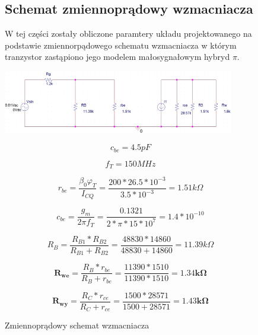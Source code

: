 \documentclass[a4paper,12pt]{article}
\begin{document}
  \begin{figure}
  

\subsection{Schemat zmiennoprądowy wzmacniacza}
W tej części zostały obliczone paramtery układu projektowanego na podstawie zmiennorpądowego schematu
wzmacniacza w którym tranzystor zastąpiono jego modelem małosygnałowym hybryd $\pi$.

  \begin{center}
  \includegraphics[width=0.9\textwidth]{pi.jpg}
  \caption{Zmiennoprądowy schemat wzmacniacza }
  \end{center}



\begin{equation}
 c_{be} = 4.5pF
\end{equation}

\begin{equation}
 f_T = 150MHz
\end{equation}

\begin{equation}
r_{be} = \frac{\beta_0 \varphi_T}{I_{CQ}} = \frac{200 * 26.5*10^{-3}}{3.5*10^{-3}} = 1.51k\Omega
\end{equation}

\begin{equation}
 c_{be} = \frac{g_m}{2\pi f_T} = \frac{0.1321}{2*\pi*15*10^7} = 1.4*10^{-10}
\end{equation}

\begin{equation}
 R_B = \frac{R_{B1}*R_{B2}}{R_{B1}+R_{B2}} = \frac{48830*14860}{48830+14860} = 11.39k\Omega
\end{equation}

\begin{equation}
 \mathbf{R_{we}} = \frac{R_{B}*r_{be}}{R_{B}+r_{be}} = \frac{11390*1510}{11390*1510} = \mathbf{1.34k\Omega}
\end{equation}
 
 \begin{equation}
 \mathbf{R_{wy}} =  \frac{R_{C}*r_{ce}}{R_{C}+r_{ce}} = \frac{1500*28571}{1500+28571} = \mathbf{1.43k\Omega}
\end{equation}
 
\end{figure}
\end{document}

